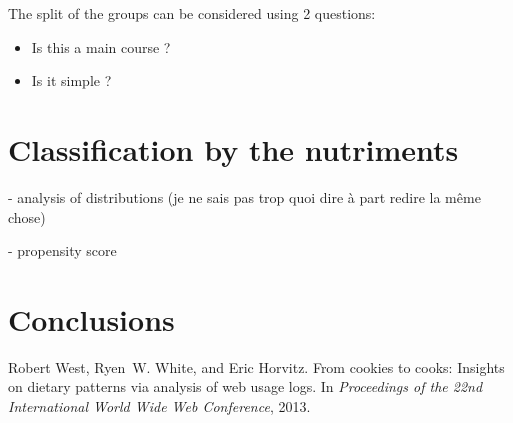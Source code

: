 \documentclass[11pt]{article}
\begin{document}
The split of the groups can be considered using 2 questions:
\begin{itemize}
	\item Is this a main course ?
	\item Is it simple ?
\end{itemize}
\section{Classification by the nutriments}
- analysis of distributions (je ne sais pas trop quoi dire à part redire la même chose)

- propensity score

\section{Conclusions}

\begin{thebibliography}{}
	
	Robert West, Ryen~W. White, and Eric Horvitz.
	\newblock From cookies to cooks: Insights on dietary patterns via analysis of
	web usage logs.
	\newblock In {\em Proceedings of the 22nd International World Wide Web
		Conference}, 2013.
	
\end{thebibliography}
\end{document}

